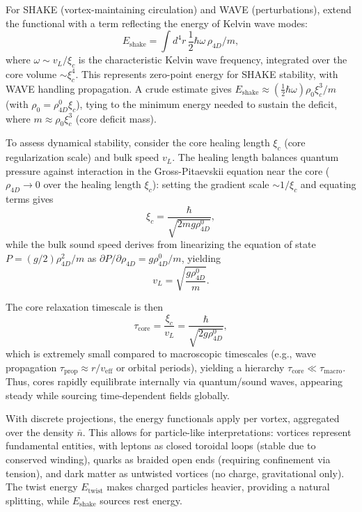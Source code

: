For SHAKE (vortex-maintaining circulation) and WAVE (perturbations), extend the functional with a term reflecting the energy of Kelvin wave modes:
\begin{equation}
E_{\text{shake}} = \int d^4 r \, \frac{1}{2} \hbar \omega \, \rho_{4D} / m,
\end{equation}
where $\omega \sim v_L / \xi_c$ is the characteristic Kelvin wave frequency, integrated over the core volume $\sim \xi_c^4$. This represents zero-point energy for SHAKE stability, with WAVE handling propagation. A crude estimate gives $E_{\text{shake}} \approx (\frac{1}{2} \hbar \omega) \rho_0 \xi_c^3 / m$ (with $\rho_0 = \rho_{4D}^0 \xi_c$), tying to the minimum energy needed to sustain the deficit, where $m \approx \rho_0 \xi_c^3$ (core deficit mass).

To assess dynamical stability, consider the core healing length $\xi_c$ (core regularization scale) and bulk speed $v_L$. The healing length balances quantum pressure against interaction in the Gross-Pitaevskii equation near the core ($\rho_{4D} \to 0$ over the healing length $\xi_c$): setting the gradient scale $\sim 1/\xi_c$ and equating terms gives
\begin{equation}
\xi_c = \frac{\hbar}{\sqrt{2 m g \rho_{4D}^0}},
\end{equation}
while the bulk sound speed derives from linearizing the equation of state $P = (g/2) \rho_{4D}^2 / m$ as $\partial P / \partial \rho_{4D} = g \rho_{4D}^0 / m$, yielding
\begin{equation}
v_L = \sqrt{\frac{g \rho_{4D}^0}{m}}.
\end{equation}

The core relaxation timescale is then
\begin{equation}
\tau_{\text{core}} = \frac{\xi_c}{v_L} = \frac{\hbar}{\sqrt{2 g \rho_{4D}^0}},
\end{equation}
which is extremely small compared to macroscopic timescales (e.g., wave propagation $\tau_{\text{prop}} \approx r / v_{\text{eff}}$ or orbital periods), yielding a hierarchy $\tau_{\text{core}} \ll \tau_{\text{macro}}$. Thus, cores rapidly equilibrate internally via quantum/sound waves, appearing steady while sourcing time-dependent fields globally.

With discrete projections, the energy functionals apply per vortex, aggregated over the density $\bar{n}$. This allows for particle-like interpretations: vortices represent fundamental entities, with leptons as closed toroidal loops (stable due to conserved winding), quarks as braided open ends (requiring confinement via tension), and dark matter as untwisted vortices (no charge, gravitational only). The twist energy $E_{\text{twist}}$ makes charged particles heavier, providing a natural splitting, while $E_{\text{shake}}$ sources rest energy.

